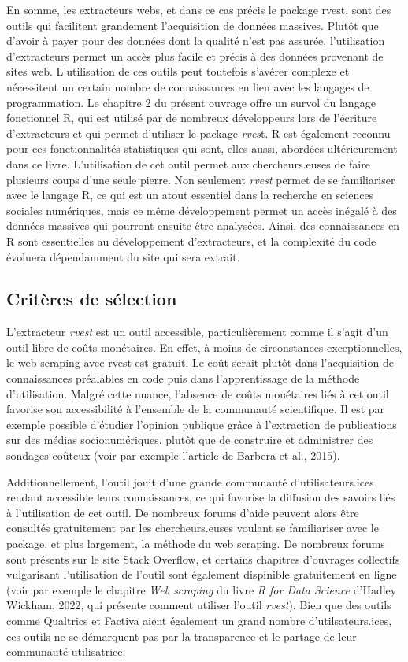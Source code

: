 \documentclass[
  letterpaper,
  DIV=11,
  numbers=noendperiod]{scrreprt}
\begin{document}
En somme, les extracteurs webs, et dans ce cas précis le package rvest,
sont des outils qui facilitent grandement l'acquisition de données
massives. Plutôt que d'avoir à payer pour des données dont la qualité
n'est pas assurée, l'utilisation d'extracteurs permet un accès plus
facile et précis à des données provenant de sites web. L'utilisation de
ces outils peut toutefois s'avérer complexe et nécessitent un certain
nombre de connaissances en lien avec les langages de programmation. Le
chapitre 2 du présent ouvrage offre un survol du langage fonctionnel R,
qui est utilisé par de nombreux développeurs lors de l'écriture
d'extracteurs et qui permet d'utiliser le package \emph{rves}t. R est
également reconnu pour ces fonctionnalités statistiques qui sont, elles
aussi, abordées ultérieurement dans ce livre. L'utilisation de cet outil
permet aux chercheurs.euses de faire plusieurs coups d'une seule pierre.
Non seulement \emph{rvest} permet de se familiariser avec le langage R,
ce qui est un atout essentiel dans la recherche en sciences sociales
numériques, mais ce même développement permet un accès inégalé à des
données massives qui pourront ensuite être analysées. Ainsi, des
connaissances en R sont essentielles au développement d'extracteurs, et
la complexité du code évoluera dépendamment du site qui sera extrait.

\subsection{Critères de sélection}\label{crituxe8res-de-suxe9lection-1}

L'extracteur \emph{rvest} est un outil accessible, particulièrement
comme il s'agit d'un outil libre de coûts monétaires. En effet, à moins
de circonstances exceptionnelles, le web scraping avec rvest est
gratuit. Le coût serait plutôt dans l'acquisition de connaissances
préalables en code puis dans l'apprentissage de la méthode
d'utilisation. Malgré cette nuance, l'absence de coûts monétaires liés à
cet outil favorise son accessibilité à l'ensemble de la communauté
scientifique. Il est par exemple possible d'étudier l'opinion publique
grâce à l'extraction de publications sur des médias socionumériques,
plutôt que de construire et administrer des sondages coûteux (voir par
exemple l'article de Barbera et al., 2015).

Additionnellement, l'outil jouit d'une grande communauté
d'utilisateurs.ices rendant accessible leurs connaissances, ce qui
favorise la diffusion des savoirs liés à l'utilisation de cet outil. De
nombreux forums d'aide peuvent alors être consultés gratuitement par les
chercheurs.euses voulant se familiariser avec le package, et plus
largement, la méthode du web scraping. De nombreux forums sont présents
sur le site Stack Overflow, et certains chapitres d'ouvrages collectifs
vulgarisant l'utilisation de l'outil sont également dispinible
gratuitement en ligne (voir par exemple le chapitre \emph{Web scraping}
du livre \emph{R for Data Science} d'Hadley Wickham, 2022, qui présente
comment utiliser l'outil \emph{rvest}). Bien que des outils comme
Qualtrics et Factiva aient également un grand nombre d'utilsateurs.ices,
ces outils ne se démarquent pas par la transparence et le partage de
leur communauté utilisatrice.
\end{document}

